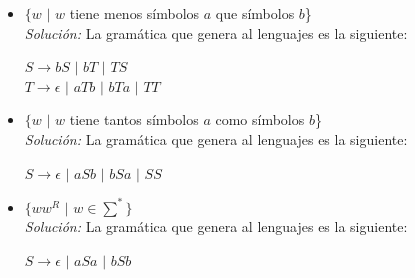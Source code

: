 \documentclass[letterpaper,11pt]{article}
\begin{document}
\begin{enumerate}
\begin{itemize}
            \item $\{w$ $|$ $w$ tiene menos símbolos $a$ que símbolos $b$\} \\
            \textit{Solución:} La gramática que genera al lenguajes es la
            siguiente:
            \begin{center}
               $S \rightarrow bS$ $|$ $bT$ $|$ $TS$ \\
               $T \rightarrow \epsilon$ $|$ $aTb$ $|$ $bTa$ $|$ $TT$
            \end{center}
            
            \item $\{w$ $|$ $w$ tiene tantos símbolos $a$ como símbolos $b$\} \\
            \textit{Solución:} La gramática que genera al lenguajes es la
            siguiente:
            \begin{center}
               $S \rightarrow \epsilon$ $|$ $aSb$ $|$ $bSa$ $|$ $SS$
            \end{center}
            
            \item $\{ww^{R}$ $|$ $w \in \sum^{*}\}$ \\
            \textit{Solución:} La gramática que genera al lenguajes es la
            siguiente:
            \begin{center}
               $S \rightarrow \epsilon$ $|$ $aSa$ $|$ $bSb$
            \end{center}
       
        \end{itemize}
        

\end{enumerate}
\end{document}
